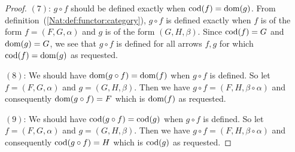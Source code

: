 \begin{proof}
    $(7)$: $g\circ f$ should be defined exactly when $\mbox{\rm cod}(f)=\mbox{\rm dom}(g)$. From
    definition~(\ref{Nat:def:functor:category}), $g\circ f$ is defined 
    exactly when $f$ is of the form $f=(F,G,\alpha)$ and $g$ is of the form
    $(G,H,\beta)$. Since $\mbox{\rm cod}(f)=G$ and $\mbox{\rm dom}(g)=G$, we see that
    $g\circ f$ is defined for all arrows $f,g$ for which $\mbox{\rm cod}(f)=\mbox{\rm dom}(g)$ 
    as requested.

    $(8)$: We should have $\mbox{\rm dom}(g\circ f) = \mbox{\rm dom}(f)$ when $g\circ f$ is defined.
    So let $f=(F,G,\alpha)$ and $g=(G,H,\beta)$. Then we have 
    $g\circ f=(F,H,\beta\circ\alpha)$ and consequently 
    $\mbox{\rm dom}(g\circ f)=F$ which is $\mbox{\rm dom}(f)$ as requested.

    $(9)$: We should have $\mbox{\rm cod}(g\circ f) = \mbox{\rm cod}(g)$ when $g\circ f$ is defined.
    So let $f=(F,G,\alpha)$ and $g=(G,H,\beta)$. Then we have 
    $g\circ f=(F,H,\beta\circ\alpha)$ and consequently $\mbox{\rm cod}(g\circ f)=H$ which
    is $\mbox{\rm cod}(g)$ as requested.
\end{proof}
